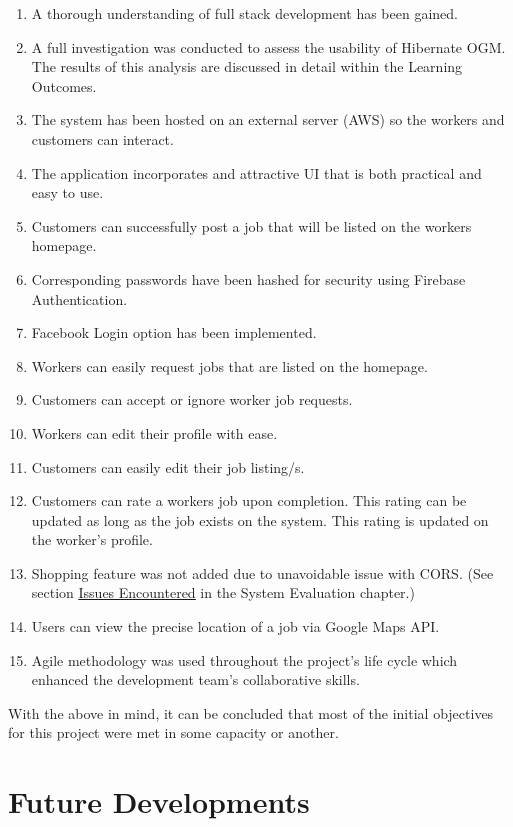 \begin{enumerate}
    \item A thorough understanding of full stack development has been gained.
    \item A full investigation was conducted to assess the usability of Hibernate OGM. The results of this analysis are discussed in detail within the Learning Outcomes.
    \item The system has been hosted on an external server (AWS) so the workers and customers can interact.
    \item The application incorporates and attractive UI that is both practical and easy to use.
    \item Customers can successfully post a job that will be listed on the workers homepage.
    \item Corresponding passwords have been hashed for security using Firebase Authentication.
    \item Facebook Login option has been implemented.
    \item Workers can easily request jobs that are listed on the homepage.
    \item Customers can accept or ignore worker job requests.
    \item Workers can edit their profile with ease.
    \item Customers can easily edit their job listing/s.
    \item Customers can rate a workers job upon completion. This rating can be updated as long as the job exists on the system. This rating is updated on the worker's profile.
    \item Shopping feature was not added due to unavoidable issue with CORS. (See section \hyperref[sec:SystemEvaluationWebScraping]{\underline{Issues Encountered}} in the System Evaluation chapter.)
    \item Users can view the precise location of a job via Google Maps API.
    \item Agile methodology was used throughout the project's life cycle which enhanced the development team's collaborative skills.
\end{enumerate}

With the above in mind, it can be concluded that most of the initial objectives for this project were met in some capacity or another.

\section{Future Developments}
\label{sec:ConclusionFutureDevelopments}

